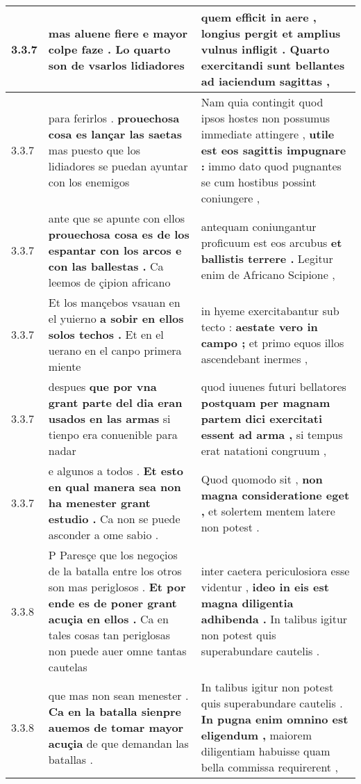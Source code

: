 \begin{tabular}{|p{1cm}|p{6.5cm}|p{6.5cm}|}
3.3.7 & mas aluene fiere \textbf{ e mayor colpe faze . } Lo quarto son de vsarlos lidiadores & quem efficit in aere , longius pergit \textbf{ et amplius vulnus infligit . } Quarto exercitandi sunt bellantes ad iaciendum sagittas , \\\hline
3.3.7 & para ferirlos . \textbf{ prouechosa cosa es lançar las saetas } mas puesto que los lidiadores se puedan ayuntar con los enemigos & Nam quia contingit quod ipsos hostes non possumus immediate attingere , \textbf{ utile est eos sagittis impugnare : } immo dato quod pugnantes se cum hostibus possint coniungere , \\\hline
3.3.7 & ante que se apunte con ellos \textbf{ prouechosa cosa es de los espantar con los arcos e con las ballestas . } Ca leemos de çipion africano & antequam coniungantur proficuum est eos arcubus \textbf{ et ballistis terrere . } Legitur enim de Africano Scipione , \\\hline
3.3.7 & Et los mançebos vsauan en el yuierno \textbf{ a sobir en ellos solos techos . } Et en el uerano en el canpo primera miente & in hyeme exercitabantur sub tecto : \textbf{ aestate vero in campo ; } et primo equos illos ascendebant inermes , \\\hline
3.3.7 & despues \textbf{ que por vna grant parte del dia eran usados en las armas } si tienpo era conuenible para nadar & quod iuuenes futuri bellatores \textbf{ postquam per magnam partem dici exercitati essent ad arma , } si tempus erat natationi congruum , \\\hline
3.3.7 & e algunos a todos . \textbf{ Et esto en qual manera sea non ha menester grant estudio . } Ca non se puede asconder a ome sabio . & Quod quomodo sit , \textbf{ non magna consideratione eget , } et solertem mentem latere non potest . \\\hline
3.3.8 & P Paresçe que los negoçios de la batalla entre los otros son mas periglosos . \textbf{ Et por ende es de poner grant acuçia en ellos . } Ca en tales cosas tan periglosas non puede auer omne tantas cautelas & inter caetera periculosiora esse videntur , \textbf{ ideo in eis est magna diligentia adhibenda . } In talibus igitur non potest quis superabundare cautelis . \\\hline
3.3.8 & que mas non sean menester . \textbf{ Ca en la batalla sienpre auemos de tomar mayor acuçia } de que demandan las batallas . & In talibus igitur non potest quis superabundare cautelis . \textbf{ In pugna enim omnino est eligendum , } maiorem diligentiam habuisse quam bella commissa requirerent , \\\hline

\end{tabular}
